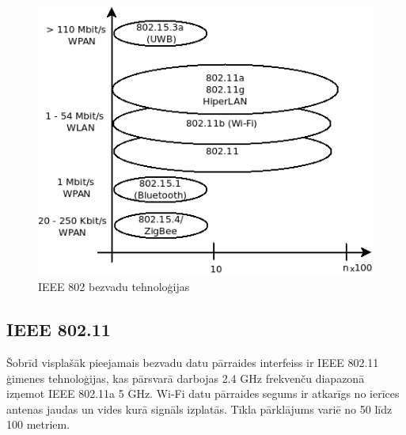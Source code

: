 \begin{figure}[!htb]
 \centering
\includegraphics[scale=0.6]{./graph/wireless.png}
\caption{IEEE 802 bezvadu tehnoloģijas}
\end{figure}




\subsection{IEEE 802.11}
Šobrīd visplašāk  pieejamais bezvadu datu pārraides interfeiss ir IEEE 802.11 ģimenes tehnoloģijas, kas pārsvarā darbojas 2.4 GHz frekvenču diapazonā izņemot IEEE 802.11a 5 GHz. Wi-Fi datu pārraides segums ir atkarīgs no  ierīces antenas jaudas un vides kurā signāls izplatās. Tīkla pārklājums variē no 50 līdz 100 metriem.

